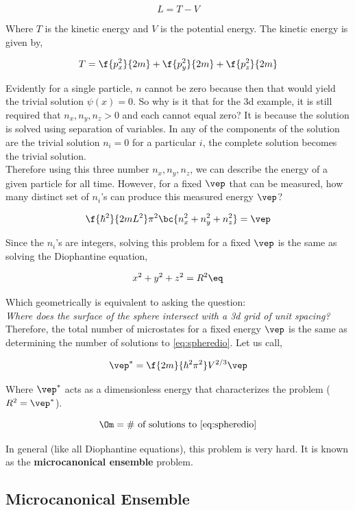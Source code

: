 \documentclass{article}
\begin{document}
\[ L = T - V \]

Where $T$ is the kinetic energy and $V$ is the potential energy. The kinetic energy is given by,

\[ T = \f{p_x^2}{2m} + \f{p_y^2}{2m} + \f{p_z^2}{2m} \]

Evidently for a single particle, $n$ cannot be zero because then that would yield the trivial solution $\psi(x) = 0$. So why is it that for the 3d example, it is still required that $n_x, n_y, n_z > 0$ and each cannot equal zero? It is because the solution is solved using separation of variables. In any of the components of the solution are the trivial solution $n_i = 0$ for a particular $i$, the complete solution becomes the trivial solution. \\

Therefore using this three number $n_x, n_y, n_z$, we can describe the energy of a given particle for all time. However, for a fixed $\vep$ that can be measured, how many distinct set of $n_i$'s can produce this measured energy $\vep$?

\[ \f{\hbar^2}{2mL^2} \pi^2 \bc{n_x^2 + n_y^2 + n_z^2} = \vep\]

Since the $n_i$'s are integers, solving this problem for a fixed $\vep$ is the same as solving the Diophantine equation,

\[ x^2 + y^2 + z^2 = R^2 \eq \label{eq:spheredio}\]

Which geometrically is equivalent to asking the question:\\

\textit{Where does the surface of the sphere intersect with a 3d grid of unit spacing?} \\

Therefore, the total number of microstates for a fixed energy $\vep$ is the same as determining the number of solutions to \eqref{eq:spheredio}. Let us call,

\[ \vep^* = \f{2m}{\hbar^2\pi^2}V^{2/3} \vep \]

Where $\vep^*$ acts as a dimensionless energy that characterizes the problem ($R^2 = \vep^*$).

\[ \Om = \text{\# of solutions to \eqref{eq:spheredio}} \]

In general (like all Diophantine equations), this problem is very hard. It is known as the \textbf{microcanonical ensemble} problem.

\subsection{Microcanonical Ensemble}
\end{document}
